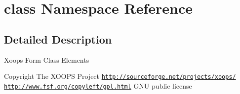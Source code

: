 \hypertarget{namespaceclass}{\section{class Namespace Reference}
\label{namespaceclass}
}


\subsection{Detailed Description}
Xoops Form Class Elements

\begin{DoxyCopyright}{Copyright}
The X\-O\-O\-P\-S Project \href{http://sourceforge.net/projects/xoops/}{\tt http\-://sourceforge.\-net/projects/xoops/}  \href{http://www.fsf.org/copyleft/gpl.html}{\tt http\-://www.\-fsf.\-org/copyleft/gpl.\-html} G\-N\-U public license 
\end{DoxyCopyright}
